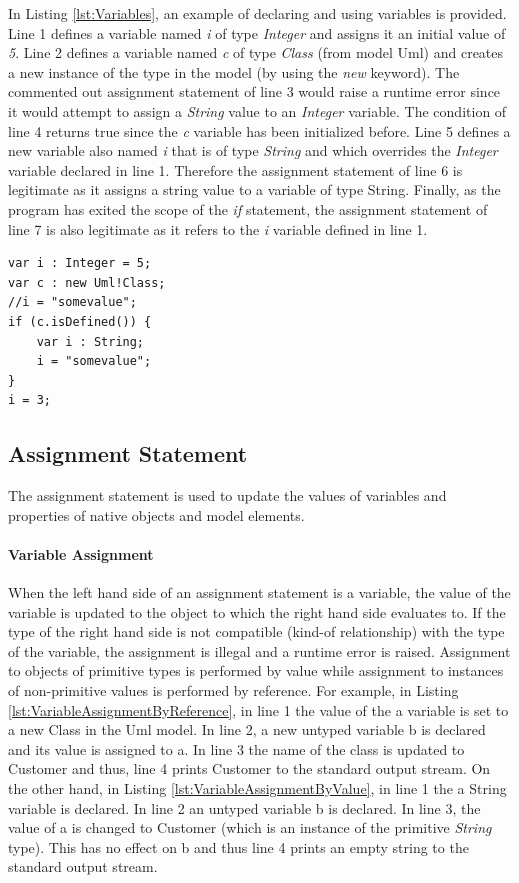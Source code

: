 In Listing \ref{lst:Variables}, an example of declaring and using variables is provided. Line 1 defines a variable named \emph{i} of type \emph{Integer} and assigns it an initial value of \emph{5}. Line 2 defines a variable named \emph{c} of type \emph{Class} (from model Uml) and creates a new instance of the type in the model (by using the \emph{new} keyword). The commented out assignment statement of line 3 would raise a runtime error since it would attempt to assign a \emph{String} value to an \emph{Integer} variable. The condition of line 4 returns true since the \emph{c} variable has been initialized before. Line 5 defines a new variable also named \emph{i} that is of type \emph{String} and which overrides the \emph{Integer} variable declared in line 1. Therefore the assignment statement of line 6 is legitimate as it assigns a string value to a variable of type String. Finally, as the program has exited the scope of the \emph{if} statement, the assignment statement of line 7 is also legitimate as it refers to the \emph{i} variable defined in line 1.

\begin{lstlisting}[float=tbp, caption=Example illustrating declaration and use of variables, label=lst:Variables, language=EOL]
var i : Integer = 5;
var c : new Uml!Class;
//i = "somevalue";
if (c.isDefined()) {
	var i : String;
	i = "somevalue";
}
i = 3;
\end{lstlisting}

\subsection{Assignment Statement}

The assignment statement is used to update the values of variables and  properties of native objects and model elements.

\paragraph{Variable Assignment}

When the left hand side of an assignment statement is a variable, the value of the variable is updated to the object to which the right hand side evaluates to. If the type of the right hand side is not compatible (kind-of relationship) with the type of the variable, the assignment is illegal and a runtime error is raised. Assignment to objects of primitive types is performed by value while assignment to instances of non-primitive values is performed by reference. For example, in Listing \ref{lst:VariableAssignmentByReference}, in line 1 the value
of the a variable is set to a new Class in the Uml model. In line 2, a new untyped variable b is declared and its value is assigned to a. In line 3 the name of the class is updated to Customer and thus, line 4 prints Customer to the standard output stream. On the other hand, in Listing \ref{lst:VariableAssignmentByValue}, in line 1 the a String variable is declared. In line 2 an untyped variable b is declared. In line 3, the value of a is changed to Customer (which is an instance of the primitive \emph{String} type). This has no effect on b and thus line 4 prints an empty string to the standard output stream.

